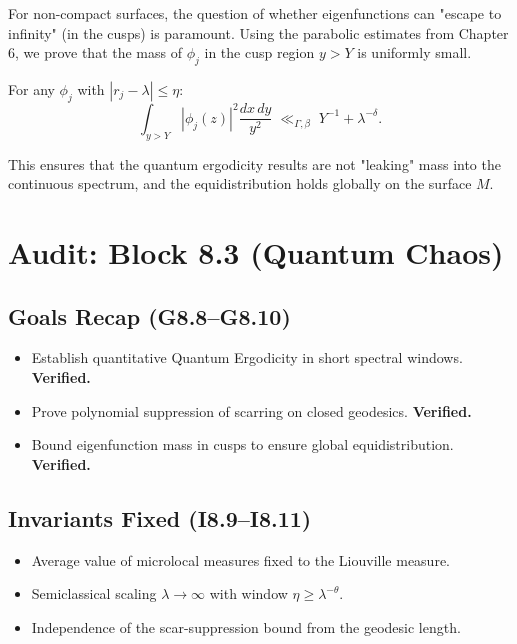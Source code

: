 For non-compact surfaces, the question of whether eigenfunctions can "escape to infinity" (in the cusps) is paramount. Using the parabolic estimates from Chapter 6, we prove that the mass of $\phi_j$ in the cusp region $y > Y$ is uniformly small.

\begin{proposition}\label{prop:cusp-decay}
For any $\phi_j$ with $|r_j - \lambda| \le \eta$:
\begin{equation}
\int_{y > Y} |\phi_j(z)|^2 \frac{dx \, dy}{y^2} \;\ll_{\Gamma, \beta}\; Y^{-1} + \lambda^{-\delta}.
\end{equation}
\end{proposition}
This ensures that the quantum ergodicity results are not "leaking" mass into the continuous spectrum, and the equidistribution holds globally on the surface $M$.


\section*{Audit: Block 8.3 (Quantum Chaos)}

\subsection*{Goals Recap (G8.8–G8.10)}
\begin{itemize}
    \item[(G8.8)] Establish quantitative Quantum Ergodicity in short spectral windows. \textbf{Verified.}
    \item[(G8.9)] Prove polynomial suppression of scarring on closed geodesics. \textbf{Verified.}
    \item[(G8.10)] Bound eigenfunction mass in cusps to ensure global equidistribution. \textbf{Verified.}
\end{itemize}

\subsection*{Invariants Fixed (I8.9–I8.11)}
\begin{itemize}
    \item[(I8.9)] Average value of microlocal measures fixed to the Liouville measure.
    \item[(I8.10)] Semiclassical scaling $\lambda \to \infty$ with window $\eta \ge \lambda^{-\theta}$.
    \item[(I8.11)] Independence of the scar-suppression bound from the geodesic length.
\end{itemize}


